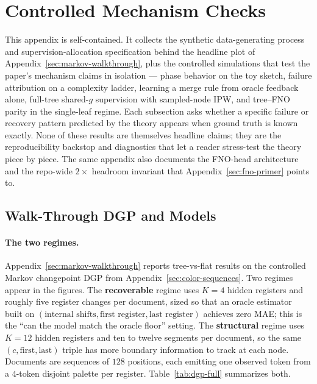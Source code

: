 \section{Controlled Mechanism Checks}\label{app:mechanism-checks}

This appendix is self-contained. It collects the synthetic
data-generating process and supervision-allocation specification
behind the headline plot of Appendix~\ref{sec:markov-walkthrough},
plus the controlled simulations that test the paper's mechanism
claims in isolation --- phase behavior on the toy sketch, failure
attribution on a complexity ladder, learning a merge rule from oracle
feedback alone, full-tree shared-$g$ supervision with sampled-node
IPW, and tree--FNO parity in the single-leaf regime. Each subsection
asks whether a specific failure or recovery pattern predicted by the
theory appears when ground truth is known exactly. None of these
results are themselves headline claims; they are the reproducibility
backstop and diagnostics that let a reader stress-test the theory
piece by piece. The same appendix also documents the FNO-head
architecture and the repo-wide $2\times$ headroom invariant that
Appendix~\ref{sec:fno-primer} points to.

\subsection{Walk-Through DGP and Models}\label{app:walkthrough-dgp}

\paragraph{The two regimes.}
Appendix~\ref{sec:markov-walkthrough} reports tree-vs-flat results on
the controlled Markov changepoint DGP from
Appendix~\ref{sec:color-sequences}. Two regimes appear in the
figures. The \textbf{recoverable} regime uses $K=4$ hidden registers
and roughly five register changes per document, sized so that an
oracle estimator built on $(\text{internal shifts}, \text{first
register}, \text{last register})$ achieves zero MAE; this is the
``can the model match the oracle floor'' setting. The
\textbf{structural} regime uses $K=12$ hidden registers and ten to
twelve segments per document, so the same $(c, \text{first},
\text{last})$ triple has more boundary information to track at each
node. Documents are sequences of $128$ positions, each emitting one
observed token from a $4$-token disjoint palette per register.
Table~\ref{tab:dgp-full} summarizes both.

